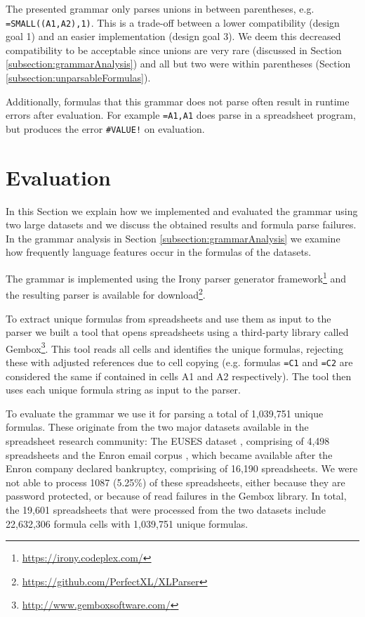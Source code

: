 \documentclass[conference]{IEEEtran}
\begin{document}
The presented grammar only parses unions in between parentheses, e.g. \texttt{=SMALL((A1,A2),1)}.
This is a trade-off between a lower compatibility (design goal 1) and an easier implementation (design goal 3).
We deem this decreased compatibility to be acceptable since unions are very rare (discussed in Section \ref{subsection:grammarAnalysis}) and all but two were within parentheses (Section \ref{subsection:unparsableFormulas}).

Additionally, formulas that this grammar does not parse often result in runtime errors after evaluation.
For example \texttt{=A1,A1} does parse in a spreadsheet program, but produces the error \texttt{\#VALUE!} on evaluation.

\section{Evaluation}
\label{sec:evaluation}

In this Section we explain how we implemented and evaluated the grammar using two large datasets and we discuss the obtained results and formula parse failures. In the grammar analysis in Section \ref{subsection:grammarAnalysis} we examine how frequently language features occur in the formulas of the datasets.

The grammar is implemented using the Irony parser generator framework\footnote{\url{https://irony.codeplex.com/}} and the resulting parser is available for download\footnote{\url{https://github.com/PerfectXL/XLParser}}.

To extract unique formulas from spreadsheets and use them as input to the parser we built a tool that opens spreadsheets using a third-party library called Gembox\footnote{\url{http://www.gemboxsoftware.com/}}. This tool reads all cells and identifies the unique formulas, rejecting these with adjusted references due to cell copying (e.g. formulas \texttt{=C1} and \texttt{=C2} are considered the same if contained in cells A1 and A2 respectively). The tool then uses each unique formula string as input to the parser.

To evaluate the grammar we use it for parsing a total of 1,039,751 unique formulas. These originate from the two major datasets available in the spreadsheet research community: The EUSES dataset \cite{euses}, comprising of 4,498 spreadsheets and the Enron email corpus \cite{enron}, which became available after the Enron company declared bankruptcy, comprising of 16,190 spreadsheets. We were not able to process 1087 (5.25\%) of these spreadsheets, either because they are password protected, or because of read failures in the Gembox library. In total, the 19,601 spreadsheets that were processed from the two datasets include 22,632,306 formula cells with 1,039,751 unique formulas.
\end{document}
